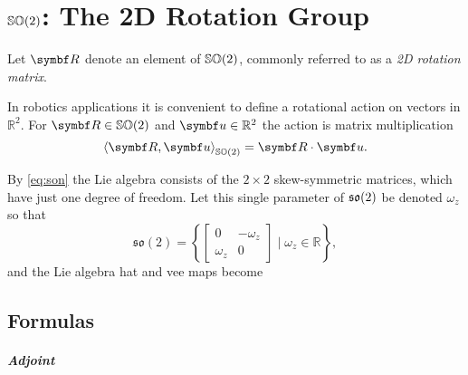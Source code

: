 \chapter{\texorpdfstring{${\mathbb{SO}(2)}$}{SO(2)}: The 2D Rotation Group}

Let $\bR$ denote an element of ${\mathbb{SO}(2)}$, commonly referred to as a \emph{2D rotation matrix}.

In robotics applications it is convenient to define a rotational action on vectors in $\mathbb{R}^2$. For $\bR \in \SOtwo$ and $\bu \in \mathbb{R}^2$ the action is matrix multiplication
\begin{equation}
  \left \langle \bR, \bu \right \rangle_{\SOtwo} = \bR \cdot \bu.
\end{equation}

By \eqref{eq:son} the Lie algebra consists of the $2 \times 2$ skew-symmetric matrices, which have just one degree of freedom. Let this single parameter of ${\mathfrak{so}(2)}$ be denoted $\omega_z$ so that
\begin{equation}
  \mathfrak{so}(2) = \left\{ \begin{bmatrix} 0 & -\omega_z \\ \omega_z & 0 \end{bmatrix} \mid \omega_z \in \mathbb{R} \right\},
\end{equation}
and the Lie algebra hat and vee maps become
\begin{center}
\end{center}

\section{Formulas}

\paragraph{Adjoint}

